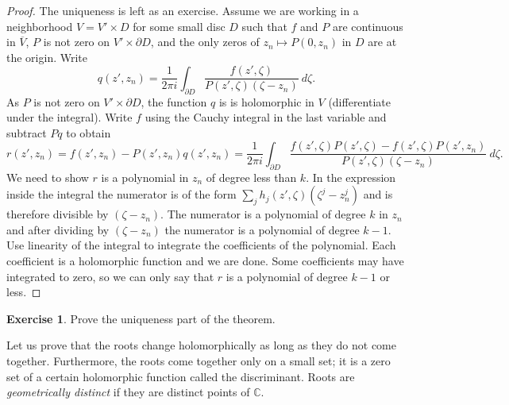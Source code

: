 \documentclass[12pt,openany]{book}
\newcommand{\C}{{\mathbb{C}}}
\newcommand{\myindex}[1]{#1\index{#1}}
\theoremstyle{plain}
\theoremstyle{remark}
\theoremstyle{definition}
\newenvironment{exbox}{%
    \def\FrameCommand{\vrule width 1pt \relax\hspace {10pt}}%
    \MakeFramed {\advance \hsize -\width \FrameRestore }%
}{%
    \endMakeFramed
}
\theoremstyle{exercise}
\newtheorem{exercise}{Exercise}[section]
\theoremstyle{example}
\begin{document}
\begin{proof}
The uniqueness is left as an exercise.  Assume we are working
in a neighborhood $V = V' \times D$ for some small disc $D$
such that $f$ and $P$ are continuous in $\overline{V}$,
$P$ is not zero on $V' \times \partial D$, and the
only zeros of $z_n \mapsto P(0,z_n)$ in $D$ are at the origin.  Write
\begin{equation*}
q(z',z_n) =
\frac{1}{2\pi i} \int_{\partial D} \frac{f(z',\zeta)}{P(z',\zeta)(\zeta-z_n)}
~d\zeta .
\end{equation*}
As $P$ is not zero on $V' \times \partial D$,
the function $q$ is 
is holomorphic in $V$ (differentiate under the integral). 
Write $f$ using the Cauchy integral in the last variable and
subtract $Pq$ to obtain
\begin{equation*}
r(z',z_n) = f(z',z_n) - P(z',z_n)q(z',z_n)
=
\frac{1}{2\pi i}
\int_{\partial D} \frac{f(z',\zeta)P(z',\zeta) - f(z',\zeta)P(z',z_n)}{P(z',\zeta)(\zeta-z_n)}
~d\zeta .
\end{equation*}
We need to show $r$ is a polynomial in $z_n$ of degree less than
$k$.  In the expression inside the integral the numerator is
of the form $\sum_j h_j(z',\zeta)(\zeta^j-z_n^j)$ and is therefore
divisible by $(\zeta-z_n)$.
The numerator is a polynomial of degree $k$ in
$z_n$ and after dividing by $(\zeta-z_n)$
the numerator is a polynomial of degree $k-1$.
Use linearity of the integral
to integrate the coefficients of the polynomial.  Each coefficient is a
holomorphic function and we are done.  Some coefficients may have
integrated to zero, so we can only say that $r$ is a polynomial
of degree $k-1$ or less.
\end{proof}

\begin{exbox}
\begin{exercise}
Prove the uniqueness part of the theorem.
\end{exercise}
\end{exbox}


Let us prove that the roots change holomorphically as long as they do not
come together.  Furthermore, the roots come together
only on a small set; it is a zero set of a certain holomorphic function
called the discriminant.  Roots are
\emph{\myindex{geometrically distinct}} if they are distinct
points of $\C$.
\end{document}
